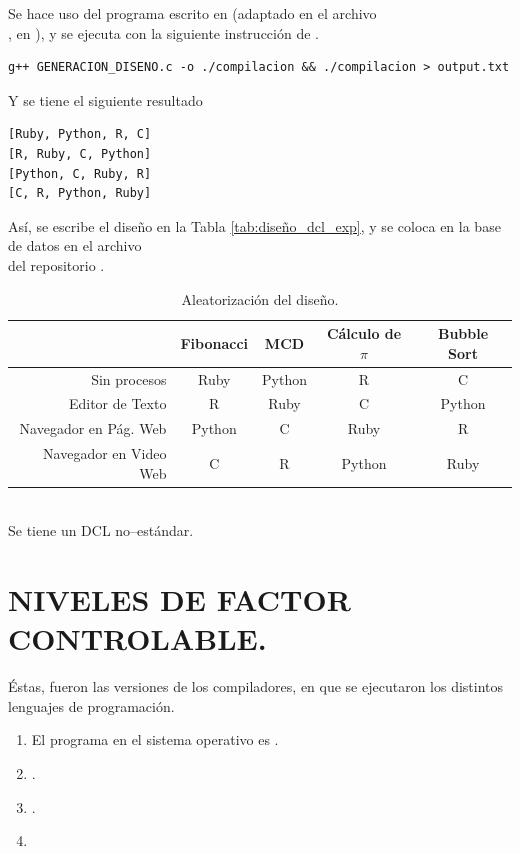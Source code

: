 \documentclass[11pt,a4paper]{article}
\begin{document}
Se hace uso del programa escrito en  (adaptado en el archivo \\, en ), y se ejecuta con la siguiente instrucción de .
\begin{lstlisting}
g++ GENERACION_DISENO.c -o ./compilacion && ./compilacion > output.txt
\end{lstlisting}
Y se tiene el siguiente resultado
\begin{lstlisting}[backgroundcolor=\color{gray!15}]
[Ruby, Python, R, C]
[R, Ruby, C, Python]
[Python, C, Ruby, R]
[C, R, Python, Ruby]
\end{lstlisting}
Así, se escribe el diseño en la Tabla \ref{tab:diseño_dcl_exp}, y se coloca en la base de datos en el archivo \\ del repositorio .
\begin{table}[hbt!]
	\centering
	\footnotesize 
	\begin{tabular}{|r|*{4}{c|}}
		\hline 
		& Fibonacci &	MCD &	Cálculo de \(\pi\) & Bubble Sort \\ \hline
		Sin procesos & Ruby &  Python &  R &  C\\
		Editor de Texto & R &  Ruby &  C &  Python\\
		Navegador en Pág. Web & Python &  C &  Ruby &  R\\
		Navegador en Video Web & C &  R &  Python &  Ruby \\ \hline
	\end{tabular}
	\caption{Aleatorización del diseño.} 
	\label{tab:experimento_completo}
\end{table}\\
Se tiene un DCL no--estándar.

\section{NIVELES DE FACTOR CONTROLABLE.} %
\label{sec:niveles_fact_control}
Éstas, fueron las versiones de los compiladores, en que se ejecutaron los distintos lenguajes de programación.
\begin{enumerate}[noitemsep]
	\item[\fbox{\texttt{C}}] El programa en el sistema operativo es .
	\item[\fbox{\texttt{Python}}] .
	\item[\fbox{\texttt{R}}] .
	\item[\fbox{\texttt{Ruby}}] 
\end{enumerate}
\end{document}
